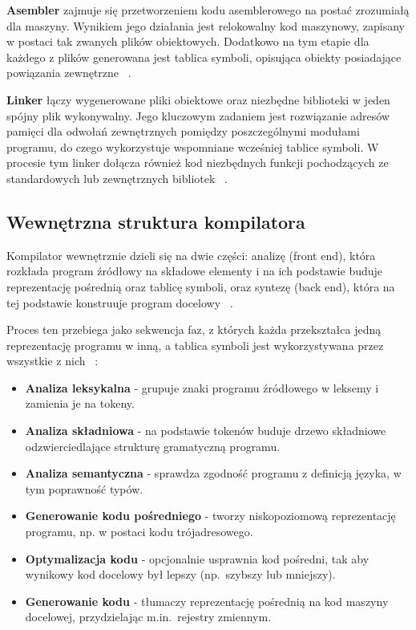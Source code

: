 \textbf{Asembler} zajmuje się przetworzeniem kodu asemblerowego na postać zrozumiałą dla maszyny. Wynikiem jego działania jest relokowalny kod maszynowy, zapisany w postaci tak zwanych plików obiektowych. Dodatkowo na tym etapie dla każdego z plików generowana jest tablica symboli, opisująca obiekty posiadające powiązania zewnętrzne ~\cite{CinNutshell}.

\textbf{Linker} łączy wygenerowane pliki obiektowe oraz niezbędne biblioteki w jeden spójny plik wykonywalny. Jego kluczowym zadaniem jest rozwiązanie adresów pamięci dla odwołań zewnętrznych pomiędzy poszczególnymi modułami programu, do czego wykorzystuje wspomniane wcześniej tablice symboli. W procesie tym linker dołącza również kod niezbędnych funkcji pochodzących ze standardowych lub zewnętrznych bibliotek ~\cite{CinNutshell}.

\subsection{Wewnętrzna struktura kompilatora}\label{subsection:WewStrukturaKompilatora}
Kompilator wewnętrznie dzieli się na dwie części: analizę (front end), która rozkłada program źródłowy na składowe elementy i na ich podstawie buduje reprezentację pośrednią oraz tablicę symboli, oraz syntezę (back end), która na tej podstawie konstruuje program docelowy ~\cite{Kompilatory_Aho}.

Proces ten przebiega jako sekwencja faz, z których każda przekształca jedną reprezentację programu w inną, a tablica symboli jest wykorzystywana przez wszystkie z nich ~\cite{Kompilatory_Aho}:

\begin{itemize}
    \item \textbf{Analiza leksykalna} - grupuje znaki programu źródłowego w leksemy i zamienia je na tokeny.
    \item \textbf{Analiza składniowa} - na podstawie tokenów buduje drzewo składniowe odzwierciedlające strukturę gramatyczną programu.
    \item \textbf{Analiza semantyczna} - sprawdza zgodność programu z definicją języka, w tym poprawność typów.
    \item \textbf{Generowanie kodu pośredniego} - tworzy niskopoziomową reprezentację programu, np. w postaci kodu trójadresowego.
    \item \textbf{Optymalizacja kodu} - opcjonalnie usprawnia kod pośredni, tak aby wynikowy kod docelowy był lepszy (np.\ szybszy lub mniejszy).
    \item \textbf{Generowanie kodu} - tłumaczy reprezentację pośrednią na kod maszyny docelowej, przydzielając m.in.\ rejestry zmiennym.
\end{itemize}

